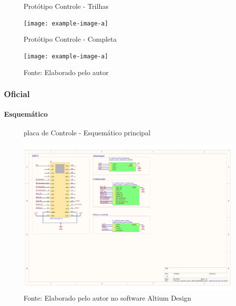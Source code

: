 \documentclass[../delivery_hospital_report.tex]{subfiles}
\begin{document}
\begin{figure}[!ht]
    \centering
    \begin{minipage}{0.5\textwidth}
        \centering
        \caption{Protótipo Controle - Trilhas}
        \texttt{[image: example-image-a]} 
        \label{fig:figura1minipg}
    \end{minipage}\hfill
    \begin{minipage}{0.5\textwidth}
        \centering
        \caption{Protótipo Controle - Completa }
        \texttt{[image: example-image-a]} 
        \label{fig:figura1minipg}
    \end{minipage}\hfill
    
    \caption*{Fonte: Elaborado pelo autor }
    \label{fig:figurasminipg}
\end{figure}

\subsubsection{Oficial}

\paragraph{Esquemático}

\begin{figure}[h]
\centering
    \caption{placa de Controle - Esquemático principal }
    \centering %
    \includegraphics[width=17cm]{modulos/controle_motor_official-1.png}
    \caption*{Fonte: Elaborado pelo autor no software Altium Design\cite{altium21} }
    \label{Protótipo placa de ## - Esquemático principal}
\end{figure}
\end{document}
